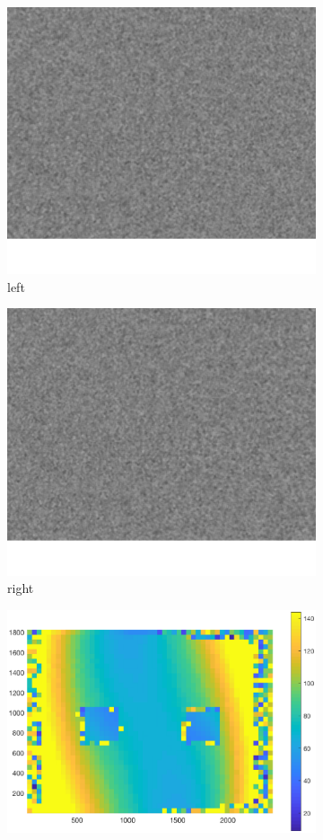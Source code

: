 \begin{figure}[h!]
	\centering
	\begin{subfigure}[t]{0.3\linewidth}
		\centering
		\includegraphics[width=0.8\linewidth]{figures/part2/test_left_2}
		\caption{left}
		\label{fig:test1}
	\end{subfigure}
	\begin{subfigure}[t]{0.3\linewidth}
		\centering
		\includegraphics[width=0.8\linewidth]{figures/part2/test_right_2}
		\caption{right}
		\label{fig:test2}
	\end{subfigure}
	\begin{subfigure}[t]{0.35\linewidth}
		\centering
		\includegraphics[width=1\linewidth]{figures/part2/test2_cmp}

\end{subfigure}
\end{figure}

